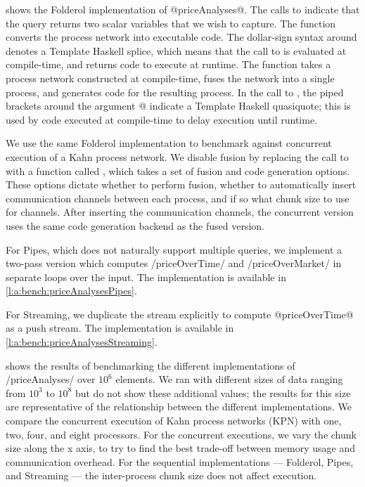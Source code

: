  shows the Folderol implementation of @priceAnalyses@.
The calls to \Hs@scalarIO@ indicate that the query returns two scalar variables that we wish to capture.
The \Hs@fuse@ function converts the process network into executable code.
The dollar-sign syntax around \Hs@fuse@ denotes a Template Haskell splice, which means that the call to \Hs@fuse@ is evaluated at compile-time, and returns code to execute at runtime.
The \Hs@fuse@ function takes a process network constructed at compile-time, fuses the network into a single process, and generates code for the resulting process.
In the call to \Hs@source@, the piped brackets around the argument @ indicate a Template Haskell quasiquote; this is used by code executed at compile-time to delay execution until runtime.

We use the same Folderol implementation to benchmark against concurrent execution of a Kahn process network.
We disable fusion by replacing the call to \Hs@fuse@ with a function called \Hs@fuseWith@, which takes a set of fusion and code generation options.
These options dictate whether to perform fusion, whether to automatically insert communication channels between each process, and if so what chunk size to use for channels.
After inserting the communication channels, the concurrent version uses the same code generation backend as the fused version.

For Pipes, which does not naturally support multiple queries, we implement a two-pass version which computes \Hs/priceOverTime/ and \Hs/priceOverMarket/ in separate loops over the input.
The implementation is available in \cref{l:a:bench:priceAnalysesPipes}.

For Streaming, we duplicate the stream explicitly to compute @priceOverTime@ as a push stream.
The implementation is available in \cref{l:a:bench:priceAnalysesStreaming}.



 shows the results of benchmarking the different implementations of \Hs/priceAnalyses/ over $10^6$ elements.
We ran with different sizes of data ranging from $10^3$ to $10^8$ but do not show these additional values; the results for this size are representative of the relationship between the different implementations.
We compare the concurrent execution of Kahn process networks (KPN) with one, two, four, and eight processors.
For the concurrent executions, we vary the chunk size along the x axis, to try to find the best trade-off between memory usage and communication overhead.
For the sequential implementations --- Folderol, Pipes, and Streaming --- the inter-process chunk size does not affect execution.

